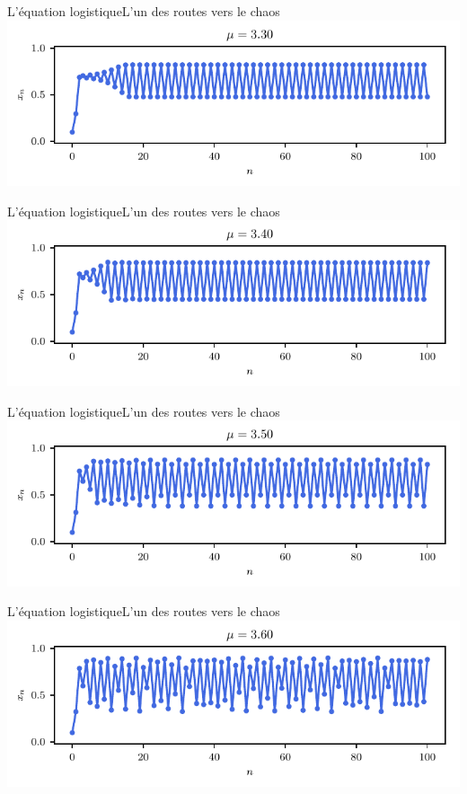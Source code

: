 \documentclass[usenames,dvipsnames,svgnames,10pt,aspectratio=169]{beamer}
\begin{document}
\begin{frame}[t, c]{L'équation logistique}{L'un des routes vers le chaos}
	\centering
	\includegraphics[width=.75\textwidth]{logistic_map_5}
\end{frame}

\begin{frame}[t, c]{L'équation logistique}{L'un des routes vers le chaos}
	\centering
	\includegraphics[width=.75\textwidth]{logistic_map_6}
\end{frame}

\begin{frame}[t, c]{L'équation logistique}{L'un des routes vers le chaos}
	\centering
	\includegraphics[width=.75\textwidth]{logistic_map_7}
\end{frame}

\begin{frame}[t, c]{L'équation logistique}{L'un des routes vers le chaos}
	\centering
	\includegraphics[width=.75\textwidth]{logistic_map_8}
\end{frame}
\end{document}
